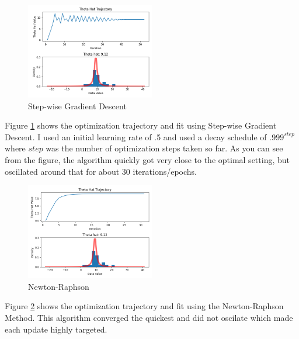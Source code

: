 


\begin{figure}[ht]
    \centering
    \includegraphics[width=0.5\textwidth]{figs/cauchy_swgd.png}
    \caption{Step-wise Gradient Descent}
    \label{fig:cauchy_swgd}
\end{figure}

Figure \ref{fig:cauchy_swgd} shows the optimization trajectory and fit using Step-wise Gradient Descent. 
I used an initial learning rate of .5 and used a decay schedule of $.999^{step}$ where $step$ was the number of optimization steps taken so far.
As you can see from the figure, the algorithm quickly got very close to the optimal setting, but oscillated around that for about 30 iterations/epochs.


\begin{figure}[ht]
    \centering
    \includegraphics[width=0.5\textwidth]{figs/cauchy_nr.png}
    \caption{Newton-Raphson}
    \label{fig:cauchy_nr}
\end{figure}

Figure \ref{fig:cauchy_nr} shows the optimization trajectory and fit using the Newton-Raphson Method. 
This algorithm converged the quickest and did not oscilate which made each update highly targeted.

